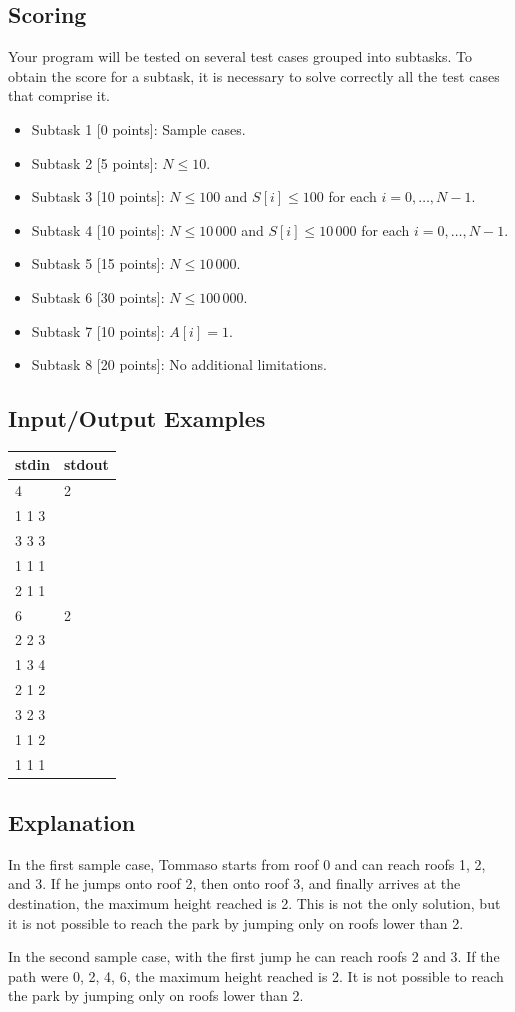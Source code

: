 \documentclass[11pt, a4paper]{article}
\begin{document}
\subsection*{Scoring}
Your program will be tested on several test cases grouped into subtasks.
To obtain the score for a subtask, it is necessary to solve correctly all the test cases that comprise it.
\begin{itemize}
    \item Subtask 1 [0 points]: Sample cases.
    \item Subtask 2 [5 points]: $N\le 10$.
    \item Subtask 3 [10 points]: $N\le 100$ and $S[i]\le 100$ for each $i=0,\dots,N-1$.
    \item Subtask 4 [10 points]: $N\le 10\,000$ and $S[i]\le 10\,000$ for each $i=0,\dots,N-1$.
    \item Subtask 5 [15 points]: $N\le 10\,000$.
    \item Subtask 6 [30 points]: $N\le 100\,000$.
    \item Subtask 7 [10 points]: $A[i]=1$.
    \item Subtask 8 [20 points]: No additional limitations.
\end{itemize}

\subsection*{Input/Output Examples}

\begin{tabular}{@{}ll@{}}
\toprule
\textbf{stdin} & \textbf{stdout} \\
\midrule
4 & 2 \\
1 1 3 & \\
3 3 3 & \\
1 1 1 & \\
2 1 1 & \\
\midrule
6 & 2 \\
2 2 3 & \\
1 3 4 & \\
2 1 2 & \\
3 2 3 & \\
1 1 2 & \\
1 1 1 & \\
\bottomrule
\end{tabular}

\subsection*{Explanation}
In the first sample case, Tommaso starts from roof 0 and can reach roofs 1, 2, and 3. If he jumps onto roof 2, then onto roof 3, and finally arrives at the destination, the maximum height reached is 2. This is not the only solution, but it is not possible to reach the park by jumping only on roofs lower than 2.

In the second sample case, with the first jump he can reach roofs 2 and 3. If the path were 0, 2, 4, 6, the maximum height reached is 2. It is not possible to reach the park by jumping only on roofs lower than 2.
\end{document}
